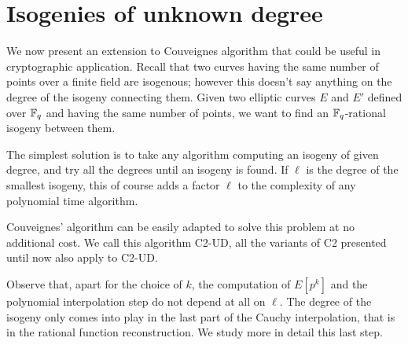 \section{Isogenies of unknown degree}
\label{sec:bounded}

We now present an extension to Couveignes algorithm that could be
useful in cryptographic application. Recall that two curves having the
same number of points over a finite field are isogenous; however this
doesn't say anything on the degree of the isogeny connecting
them. Given two elliptic curves $E$ and $E'$ defined over $\mathbb{F}_q$ and
having the same number of points, we want to find an $\mathbb{F}_q$-rational
isogeny between them.

The simplest solution is to take any algorithm computing an isogeny of
given degree, and try all the degrees until an isogeny is found. If
$\ell$ is the degree of the smallest isogeny, this of course adds a
factor $\ell$ to the complexity of any polynomial time algorithm.

Couveignes' algorithm can be easily adapted to solve this problem at
no additional cost. We call this algorithm C2-UD, all the variants of
C2 presented until now also apply to C2-UD.

Observe that, apart for the choice of $k$, the computation of $E[p^k]$
and the polynomial interpolation step do not depend at all on
$\ell$. The degree of the isogeny only comes into play in the last
part of the Cauchy interpolation, that is in the rational function
reconstruction. We study more in detail this last step.


